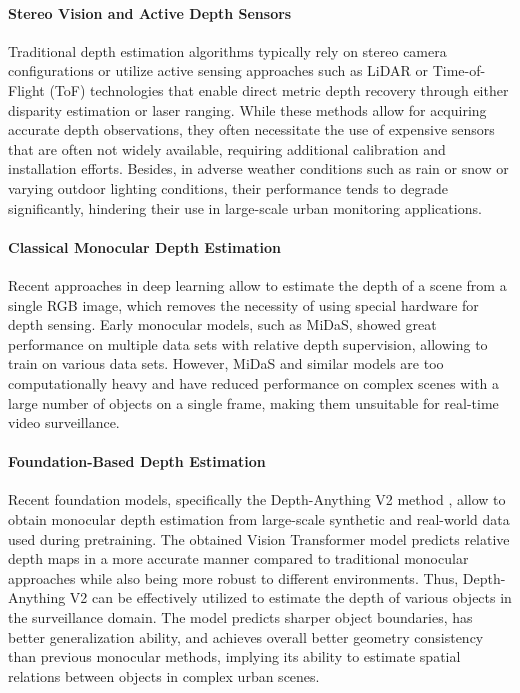 \documentclass[conference]{IEEEtran}
\begin{document}
\paragraph{Stereo Vision and Active Depth Sensors}

Traditional depth estimation algorithms typically rely on stereo camera configurations or utilize active sensing approaches such as LiDAR or Time-of-Flight (ToF) technologies that enable direct metric depth recovery through either disparity estimation or laser ranging.
While these methods allow for acquiring accurate depth observations, they often necessitate the use of expensive sensors that are often not widely available, requiring additional calibration and installation efforts. Besides, in adverse weather conditions such as rain or snow or varying outdoor lighting conditions, their performance tends to degrade significantly, hindering their use in large-scale urban monitoring applications.

\paragraph{Classical Monocular Depth Estimation}

Recent approaches in deep learning allow to estimate the depth of a scene from a single RGB image, which removes the necessity of using special hardware for depth sensing. Early monocular models, such as MiDaS, showed great performance on multiple data sets with relative depth supervision, allowing to train on various data sets. However, MiDaS and similar models are too computationally heavy and have reduced performance on complex scenes with a large number of objects on a single frame, making them unsuitable for real-time video surveillance.

\paragraph{Foundation-Based Depth Estimation}

Recent foundation models, specifically the Depth-Anything V2 method \cite{yang2024depth}, allow to obtain monocular depth estimation from large-scale synthetic and real-world data used during pretraining. The obtained Vision Transformer model predicts relative depth maps in a more accurate manner compared to traditional monocular approaches while also being more robust to different environments. Thus, Depth-Anything V2 can be effectively utilized to estimate the depth of various objects in the surveillance domain. The model predicts sharper object boundaries, has better generalization ability, and achieves overall better geometry consistency than previous monocular methods, implying its ability to estimate spatial relations between objects in complex urban scenes.
\end{document}

